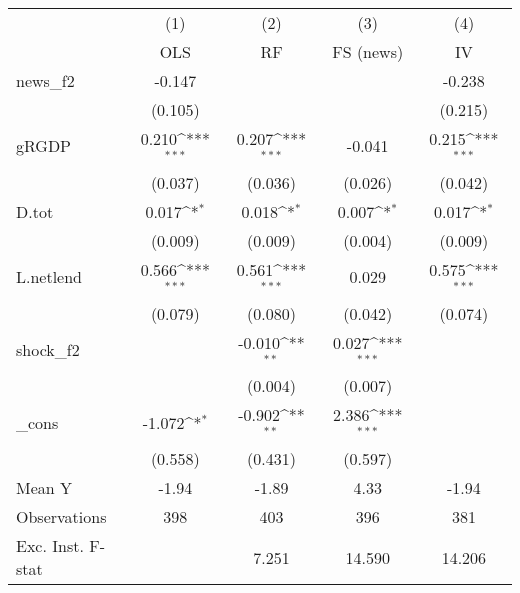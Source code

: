 {
\def\sym#1{\ifmmode^{#1}\else\(^{#1}\)\fi}
\begin{tabular}{l*{4}{c}}
\toprule
            &\multicolumn{1}{c}{(1)}&\multicolumn{1}{c}{(2)}&\multicolumn{1}{c}{(3)}&\multicolumn{1}{c}{(4)}\\
            &\multicolumn{1}{c}{OLS}&\multicolumn{1}{c}{RF}&\multicolumn{1}{c}{FS (news)}&\multicolumn{1}{c}{IV}\\
\midrule
news\_f2     &      -0.147         &                     &                     &      -0.238         \\
            &     (0.105)         &                     &                     &     (0.215)         \\
\addlinespace
gRGDP       &       0.210\sym{***}&       0.207\sym{***}&      -0.041         &       0.215\sym{***}\\
            &     (0.037)         &     (0.036)         &     (0.026)         &     (0.042)         \\
\addlinespace
D.tot       &       0.017\sym{*}  &       0.018\sym{*}  &       0.007\sym{*}  &       0.017\sym{*}  \\
            &     (0.009)         &     (0.009)         &     (0.004)         &     (0.009)         \\
\addlinespace
L.netlend   &       0.566\sym{***}&       0.561\sym{***}&       0.029         &       0.575\sym{***}\\
            &     (0.079)         &     (0.080)         &     (0.042)         &     (0.074)         \\
\addlinespace
shock\_f2    &                     &      -0.010\sym{**} &       0.027\sym{***}&                     \\
            &                     &     (0.004)         &     (0.007)         &                     \\
\addlinespace
\_cons      &      -1.072\sym{*}  &      -0.902\sym{**} &       2.386\sym{***}&                     \\
            &     (0.558)         &     (0.431)         &     (0.597)         &                     \\
\midrule
Mean Y      &       -1.94         &       -1.89         &        4.33         &       -1.94         \\
Observations&         398         &         403         &         396         &         381         \\
Exc. Inst. F-stat&                     &       7.251         &      14.590         &      14.206         \\
\bottomrule
\end{tabular}
}
